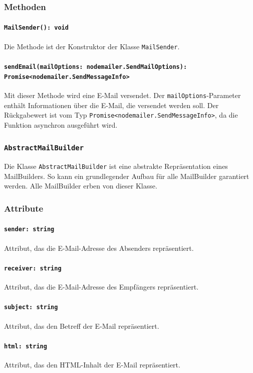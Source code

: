 \documentclass{entwurfsheft}
\begin{document}
\subsubsection*{Methoden}
\paragraph{\texttt{MailSender(): void}}
Die Methode ist der Konstruktor der Klasse \texttt{MailSender}.
\paragraph{\texttt{sendEmail(mailOptions: nodemailer.SendMailOptions): Promise<nodemailer.SendMessageInfo>}}
Mit dieser Methode wird eine E-Mail versendet. Der \texttt{mailOptions}-Parameter enthält Informationen über die E-Mail, die versendet werden soll. Der Rückgabewert ist vom Typ \texttt{Promise<nodemailer.SendMessageInfo>}, da die Funktion asynchron ausgeführt wird.

\subsubsection{\texttt{AbstractMailBuilder}}\label{sec:AbstractMailBuilder}
Die Klasse \texttt{AbstractMailBuilder} ist eine abstrakte Repräsentation eines MailBuilders. So kann ein grundlegender Aufbau für alle MailBuilder garantiert werden. Alle MailBuilder erben von dieser Klasse.
\subsubsection*{Attribute}
\paragraph{\texttt{sender: string}}
Attribut, das die E-Mail-Adresse des Absenders repräsentiert.
\paragraph{\texttt{receiver: string}}
Attribut, das die E-Mail-Adresse des Empfängers repräsentiert.
\paragraph{\texttt{subject: string}}
Attribut, das den Betreff der E-Mail repräsentiert.
\paragraph{\texttt{html: string}}
Attribut, das den HTML-Inhalt der E-Mail repräsentiert.
\end{document}

